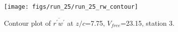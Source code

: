 \begin{figure}[H]
\centering
\texttt{[image: figs/run\_25/run\_25\_rw\_contour]}
\caption{Contour plot of $\overline{r^\prime w^\prime}$ at $z/c$=7.75, $V_{free}$=23.15, station 3.}
\label{fig:run_25_rw_contour}
\end{figure}



